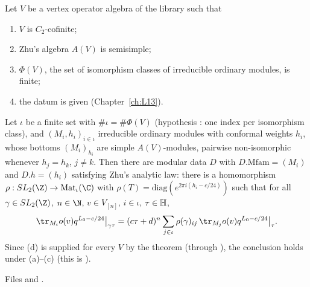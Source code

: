 \begin{theorem}\label{l15:thm:headline}
Let $V$ be a vertex operator algebra of the library such that
\begin{enumerate}
\item[(a)] $V$ is $C_2$-cofinite;
\item[(b)] Zhu's algebra $A(V)$ is semisimple;
\item[(c)] $\Phi(V)$, the set of isomorphism classes of irreducible ordinary modules, is finite;
\item[(d)] the datum  is given (Chapter~\ref{ch:L13}).
\end{enumerate}
Let $\iota$ be a finite set with $\#\iota=\#\Phi(V)$ (hypothesis : one index per isomorphism class), and $(M_i,h_i)_{i\in\iota}$ irreducible ordinary modules with conformal
weights $h_i$, whose bottoms $(M_i)_{h_i}$ are simple $A(V)$-modules, pairwise non-isomorphic whenever $h_j=h_k$, $j\neq k$.
Then there are modular data $D$ with $D.\mathrm{Mfam}=(M_i)$ and $D.h=(h_i)$ satisfying Zhu's analytic law: there is a
homomorphism $\rho:\lfifteenSL\to\mathrm{Mat}_\iota(\C)$ with $\rho(T)=\mathrm{diag}(e^{2\pi i(h_i-c/24)})$ such that for all
$\gamma\in\lfifteenSL$, $n\in\N$, $v\in V_{[n]}$, $i\in\iota$, $\tau\in\mathbb{H}$,
\begin{equation*}
  \tr_{M_i}o(v)q^{L_0-c/24}\big|_{\gamma\tau}=(c\tau+d)^n\sum_{j\in\iota}\rho(\gamma)_{ij}\,\tr_{M_j}o(v)q^{L_0-c/24}\big|_{\tau}.
\end{equation*}
Since (d) is supplied for every $V$ by the theorem  (through ), the
conclusion holds under (a)--(c) (this is ).
\end{theorem}
\noindent Files  and
.
